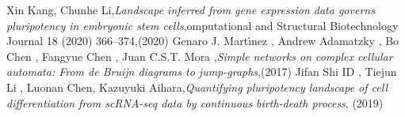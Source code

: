 \begin{thebibliography}{90}
 Xin Kang, Chunhe Li,\emph{Landscape inferred from gene expression data governs pluripotency in
embryonic stem cells},omputational and Structural Biotechnology Journal 18 (2020) 366–374,(2020)
 Genaro J. Martı́nez , Andrew Adamatzky  ,
Bo Chen , Fangyue Chen , Juan C.S.T. Mora ,\emph{Simple networks on complex cellular automata:
From de Bruijn diagrams to jump-graphs},(2017)
 Jifan Shi ID  , Tiejun Li , Luonan Chen, Kazuyuki Aihara,\emph{Quantifying pluripotency landscape of cell
differentiation from scRNA-seq data by
continuous birth-death process}, (2019)









\end{thebibliography}
\clearpage{\pagestyle{empty}\cleardoublepage}

